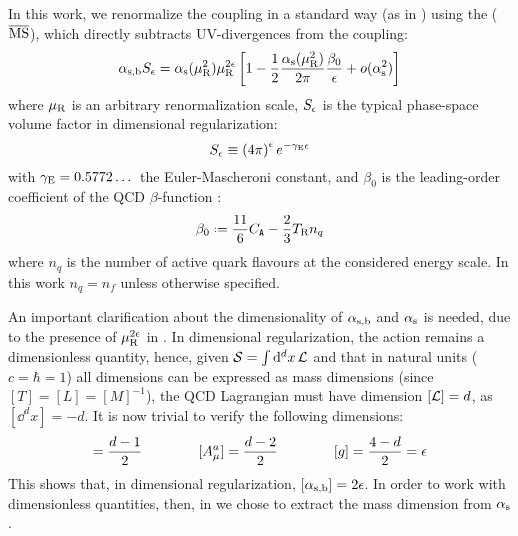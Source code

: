 In this work, we renormalize the coupling in a standard way (as in \cite{Catani-1998}) using the  ($ \overline{\text{MS}} $), which directly subtracts UV-divergences from the coupling:
\begin{equation}
  \alpha_\text{s,b} S_\epsilon = \alpha_\text{s}(\mu_\text{R}^2) \mu_\text{R}^{2\epsilon} \left[ 1 - \frac{1}{2} \frac{\alpha_\text{s}(\mu_\text{R}^2)}{2\pi} \frac{\beta_0}{\epsilon} + o(\alpha_\text{s}^2) \right]
  \label{eq:msb-def}
\end{equation}
where $ \mu_\text{R} $ is an arbitrary renormalization scale, $ S_\epsilon $ is the typical phase-space volume factor in dimensional regularization:
\begin{equation}
  S_\epsilon \equiv \left( 4\pi \right)^\epsilon e^{-\gamma_\text{E} \epsilon}
\end{equation}
with $ \gamma_\text{E} = 0.5772\dots $ the Euler-Mascheroni constant, and $ \beta_0 $ is the leading-order coefficient of the QCD $ \beta $-function :
\begin{equation}
  \beta_0 \defeq \frac{11}{6} \caa - \frac{2}{3} \ttr n_q
\end{equation}
where $ n_q $ is the number of active quark flavours at the considered energy scale. In this work $ n_q = n_f $ unless otherwise specified.

An important clarification about the dimensionality of $ \alpha_\text{s,b} $ and $ \alpha_\text{s} $ is needed, due to the presence of $ \mu_\text{R}^{2\epsilon} $ in . In dimensional regularization, the action remains a dimensionless quantity, hence, given $ \mathcal{S} = \int \mathrm{d}^dx \, \mathcal{L} $ and that in natural units ($ c = \hbar = 1 $) all dimensions can be expressed as mass dimensions (since $ [T] = [L] = [M]^{-1} $), the QCD Lagrangian  must have dimension $ [\mathcal{L}] = d $, as $ [\dd^dx] = -d $. It is now trivial to verify the following dimensions:
\begin{equation*}
  [\Psi] = \frac{d - 1}{2}
  \qquad \qquad
  [A_\mu^a] = \frac{d - 2}{2}
  \qquad \qquad
  [g] = \frac{4 - d}{2} = \de
\end{equation*}
This shows that, in dimensional regularization, $ [\alpha_\text{s,b}] = 2\epsilon $. In order to work with dimensionless quantities, then, in  we chose to extract the mass dimension from $ \alpha_\text{s} $.


